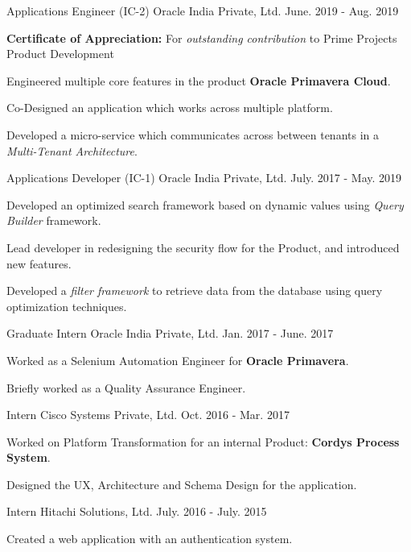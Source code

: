 \begin{cventries}
  \cventry
    {Applications Engineer (IC-2)}
    {Oracle India Private, Ltd.}
    {}
    {June. 2019 - Aug. 2019}
    {
      \begin{cvitems}
        \item {\textbf{Certificate of Appreciation:} For \textit{outstanding contribution} to Prime Projects Product Development}
        \item {Engineered multiple core features in the product \textbf{Oracle Primavera Cloud}.}
        \item {Co-Designed an application which works across multiple platform.}
        \item {Developed a micro-service which communicates across between tenants in a \textit{Multi-Tenant Architecture}.}
      \end{cvitems}
    }
  \cventry
    {Applications Developer (IC-1)}
    {Oracle India Private, Ltd.}
    {}
    {July. 2017 - May. 2019}
    {
      \begin{cvitems}
        \item {Developed an optimized search framework based on dynamic values using \textit{Query Builder} framework.}
        \item {Lead developer in redesigning the security flow for the Product, and introduced new features.}
        \item {Developed a \textit{filter framework} to retrieve data from the database using query optimization techniques.}
      \end{cvitems}
    }
  \cventry
    {Graduate Intern}
    {Oracle India Private, Ltd.}
    {}
    {Jan. 2017 - June. 2017}
    {
      \begin{cvitems}
        \item {Worked as a Selenium Automation Engineer for \textbf{Oracle Primavera}.}
        \item {Briefly worked as a Quality Assurance Engineer.}
      \end{cvitems}
    }
  \cventry
    {Intern}
    {Cisco Systems Private, Ltd.}
    {}
    {Oct. 2016 - Mar. 2017}
    {
      \begin{cvitems}
        \item {Worked on Platform Transformation for an internal Product: \textbf{Cordys Process System}.}
        \item {Designed the UX, Architecture and Schema Design for the application.}
      \end{cvitems} 
    }
  \cventry
    {Intern}
    {Hitachi Solutions, Ltd.}
    {}
    {July. 2016 - July. 2015}
    {
      \begin{cvitems}
        \item {Created a web application with an authentication system.}    
      \end{cvitems}
    }
\end{cventries}